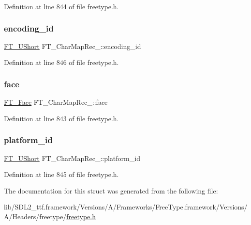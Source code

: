 Definition at line 844 of file freetype.\+h.

\mbox{\label{struct_f_t___char_map_rec___af10dd43eee8dc93e7d6191c663ae831a}} 
\subsubsection{\texorpdfstring{encoding\_id}{encoding\_id}}
{\footnotesize\ttfamily \mbox{\hyperlink{fttypes_8h_a937f6c17cf5ffd09086d8610c37b9f58}{F\+T\+\_\+\+U\+Short}} F\+T\+\_\+\+Char\+Map\+Rec\+\_\+\+::encoding\+\_\+id}



Definition at line 846 of file freetype.\+h.

\mbox{\label{struct_f_t___char_map_rec___a70a4e53e3f9818209916e5745c46dc28}} 
\subsubsection{\texorpdfstring{face}{face}}
{\footnotesize\ttfamily \mbox{\hyperlink{freetype_8h_a7eba045ee20968354fa1bff0f69740fa}{F\+T\+\_\+\+Face}} F\+T\+\_\+\+Char\+Map\+Rec\+\_\+\+::face}



Definition at line 843 of file freetype.\+h.

\mbox{\label{struct_f_t___char_map_rec___ae7f439996a8615698e780ce3c4f92457}} 
\subsubsection{\texorpdfstring{platform\_id}{platform\_id}}
{\footnotesize\ttfamily \mbox{\hyperlink{fttypes_8h_a937f6c17cf5ffd09086d8610c37b9f58}{F\+T\+\_\+\+U\+Short}} F\+T\+\_\+\+Char\+Map\+Rec\+\_\+\+::platform\+\_\+id}



Definition at line 845 of file freetype.\+h.



The documentation for this struct was generated from the following file\+:\begin{DoxyCompactItemize}
\item 
lib/\+S\+D\+L2\+\_\+ttf.\+framework/\+Versions/\+A/\+Frameworks/\+Free\+Type.\+framework/\+Versions/\+A/\+Headers/freetype/\mbox{\hyperlink{freetype_8h}{freetype.\+h}}\end{DoxyCompactItemize}

